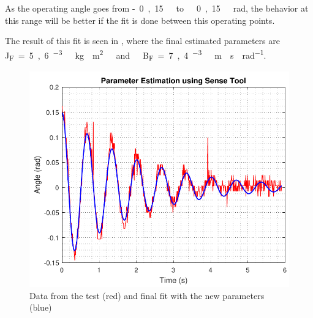 As the operating angle goes from \si{-0,15\ to\ 0,15\ rad}, the behavior at this range will be better if the fit is done between this operating points.

The result of this fit is seen in , where the final estimated parameters are \si{J_F=5,6 ^{-3}\ kg \cdot m^2\ and\ B_F=7,4 ^{-3}\ m \cdot s \cdot rad^{-1}}.

\begin{figure}[H]
	\centering
	\includegraphics[scale=0.6]{figures/SenseToolParameterEstimation}
	\caption{Data from the test (red) and final fit with the new parameters (blue)}
	\label{SenseToolParameterEstimation}
\end{figure}

